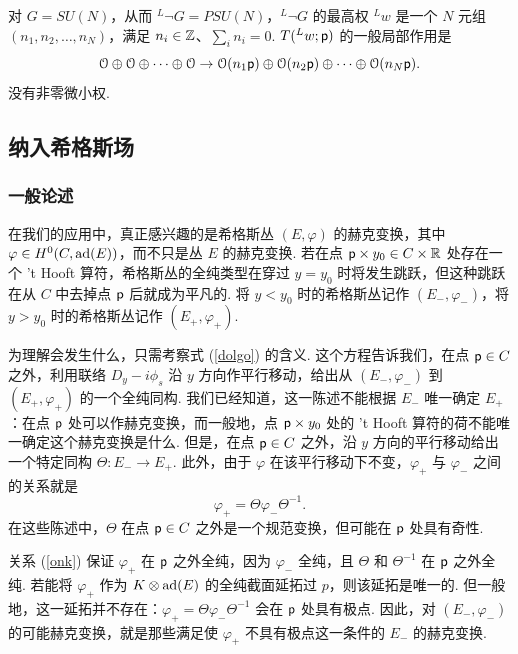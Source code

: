对 $G=SU(N)$，从而 $^L\neg G=PSU(N)$，$^L\neg G$ 的最高权 $^Lw$ 是一个 $N$ 元组 $(n_1,n_2,\dots,n_N)$，满足 $n_i\in {\mathbb Z}$、$\sum_i n_i=0$.
$T(^Lw;{\sf p})$ 的一般局部作用是
\begin{equation}\label{exc}{\mathcal O}\oplus{\mathcal O}\oplus\dots\oplus{\mathcal O}\to {\mathcal O}(n_1{\sf p})\oplus {\mathcal O}(n_2{\sf p})\oplus \dots \oplus {\mathcal O}(n_N{\sf p}). \end{equation}
没有非零微小权.

 


\subsection{纳入希格斯场}\label{inco}

\subsubsection{一般论述}\label{generalities}

在我们的应用中，真正感兴趣的是希格斯丛 $(E,\varphi)$ 的赫克变换，其中 $\varphi\in H^0(C,{\rm ad}(E))$，而不只是丛 $E$ 的赫克变换.
若在点 ${\sf p}\times y_0\in C\times {\mathbb R}$ 处存在一个 't Hooft 算符，希格斯丛的全纯类型在穿过 $y=y_0$ 时将发生跳跃，但这种跳跃在从 $C$ 中去掉点 ${\sf p}$ 后就成为平凡的.
将 $y<y_0$ 时的希格斯丛记作 $(E_-,\varphi_-)$，将 $y>y_0$ 时的希格斯丛记作 $(E_+,\varphi_+) $.

为理解会发生什么，只需考察式 (\ref{dolgo}) 的含义.
这个方程告诉我们，在点 ${\sf p}\in C$ 之外，利用联络 $D_y-i\phi_s$ 沿 $y$ 方向作平行移动，给出从 $(E_-,\varphi_-)$ 到 $(E_+,\varphi_+)$ 的一个全纯同构.
我们已经知道，这一陈述不能根据 $E_-$ 唯一确定 $E_+$：在点 ${\sf p}$ 处可以作赫克变换，而一般地，点 ${\sf p}\times y_0$ 处的 't Hooft 算符的荷不能唯一确定这个赫克变换是什么.
但是，在点 ${\sf p}\in C$ 之外，沿 $y$ 方向的平行移动给出一个特定同构 $\Theta:E_-\to E_+$.
此外，由于 $\varphi$ 在该平行移动下不变，$\varphi_+$ 与 $\varphi_-$ 之间的关系就是
\begin{equation}\label{onk}\varphi_+=\Theta\varphi_-\Theta^{-1}.\end{equation}
在这些陈述中，$\Theta$ 在点 ${\sf p}\in C$ 之外是一个规范变换，但可能在 ${\sf p}$ 处具有奇性.

关系 (\ref{onk}) 保证 $\varphi_+$ 在 ${\sf p}$ 之外全纯，因为 $\varphi_-$ 全纯，且 $\Theta$ 和 $\Theta^{-1}$ 在 ${\sf p}$ 之外全纯.
若能将 $\varphi_+$ 作为 $K\otimes{\rm ad}(E)$ 的全纯截面延拓过 $p$，则该延拓是唯一的.
但一般地，这一延拓并不存在：$\varphi_+=\Theta\varphi_-\Theta^{-1}$ 会在 ${\sf p}$ 处具有极点.
因此，对 $(E_-,\varphi_-)$ 的可能赫克变换，就是那些满足使 $\varphi_+$ 不具有极点这一条件的 $E_-$ 的赫克变换.


